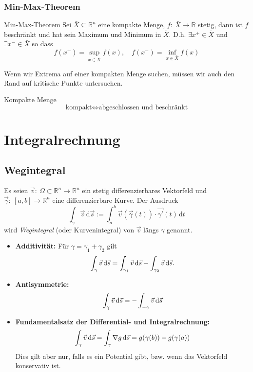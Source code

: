 \documentclass[a4paper,10pt]{article}
\def\R{\mathbb{R}}
\begin{document}
\subsubsection{Min-Max-Theorem}

\begin{mainbox}{Min-Max-Theorem}
    Sei \( \bar{X} \subseteq \R^n \) eine kompakte Menge, \( f: \: \bar{X} \to \R \) stetig, dann ist \( f \) beschränkt und hat sein Maximum und Minimum in \( \bar{X} \).
    D.h. \( \exists x^+ \in \bar{X} \) und \( \exists x^- \in \bar{X} \) so dass \[
        f(x^+) = \sup_{x \in \bar{X}} f(x), \quad f(x^-) = \inf_{x \in \bar{X}} f(x)
    \]
\end{mainbox}
Wenn wir Extrema auf einer kompakten Menge suchen, müssen wir auch den Rand auf kritische Punkte untersuchen.

\begin{subbox}{Kompakte Menge}
    \[
        \text{kompakt} \iff \text{abgeschlossen und beschränkt}
    \]
\end{subbox}


\section{Integralrechnung}

\subsection{Wegintegral}

\begin{mainbox}{}
    Es seien \( \vec{v}: \: \Omega \subset \R^n \to \R^n \) ein stetig differenzierbares Vektorfeld und \( \vec{\gamma}: \: [a, b] \to \R^n \) eine differenzierbare Kurve. Der Ausdruck \[
        \int_\gamma \vec{v} \, \mathrm{d}\vec{s} := \int_a^b \vec{v}(\vec{\gamma}(t)) \cdot \vec{\gamma'}(t) \, \mathrm{d}t
    \]
    wird \emph{Wegintegral} (oder Kurvenintegral) von \( \vec{v} \) längs \( \gamma \) genannt.
\end{mainbox}

\begin{itemize}
    \item \textbf{Additivität:} Für \( \gamma = \gamma_1 + \gamma_2 \) gilt
    \[
        \int_{\gamma} \vec{v} \odif{\vec{s}} = \int_{\gamma_1} \vec{v} \odif{\vec{s}} + \int_{\gamma_2} \vec{v} \odif{\vec{s}} \text{.}
    \]
    \item \textbf{Antisymmetrie:}
    \[
        \int_\gamma \vec{v} \odif{\vec{s}} = -\int_{-\gamma} \vec{v} \odif{\vec{s}}
    \]
    \item \textbf{Fundamentalsatz der Differential- und Integralrechnung:}
    \[
        \int_\gamma \vec{v} \odif{\vec{s}} = \int_\gamma \nabla g \odif{\vec{s}} = g(\gamma(b)) - g(\gamma(a))
    \]
    Dies gilt aber nur, falls es ein Potential gibt, bzw. wenn das Vektorfeld konservativ ist.
\end{itemize}
    
\end{document}
